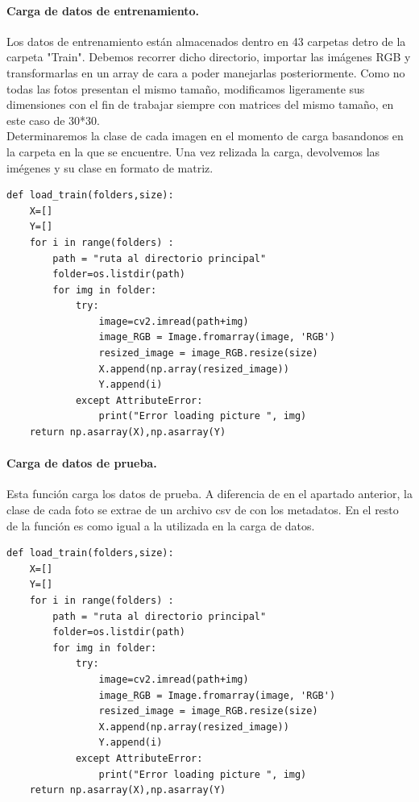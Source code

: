 \documentclass[a4paper,10pt]{article}
\begin{document}
\paragraph{Carga de datos de entrenamiento.}
Los datos de entrenamiento están almacenados dentro en 43 carpetas detro de la carpeta "Train". Debemos recorrer dicho directorio, importar las imágenes RGB y transformarlas en un array de cara a poder manejarlas posteriormente. Como no todas las fotos presentan el mismo tamaño, modificamos ligeramente sus dimensiones con el fin de trabajar siempre con matrices del mismo tamaño, en este caso de 30*30.\\
Determinaremos la clase de cada imagen en el momento de carga basandonos en la carpeta en la que se encuentre. Una vez relizada la carga, devolvemos las imégenes y su clase en formato de matriz.
\begin{lstlisting}
def load_train(folders,size):
    X=[]
    Y=[]
    for i in range(folders) :
        path = "ruta al directorio principal"
        folder=os.listdir(path)
        for img in folder:
            try:
                image=cv2.imread(path+img)
                image_RGB = Image.fromarray(image, 'RGB')
                resized_image = image_RGB.resize(size)
                X.append(np.array(resized_image))
                Y.append(i)
            except AttributeError:
                print("Error loading picture ", img)
    return np.asarray(X),np.asarray(Y)
\end{lstlisting}

\paragraph{Carga de datos de prueba.}
Esta función carga los datos de prueba. A diferencia de en el apartado anterior, la clase de cada foto se extrae de un archivo csv de con los metadatos. En el resto de la función es como igual a la utilizada en la carga de datos.

\begin{lstlisting}
def load_train(folders,size):
    X=[]
    Y=[]
    for i in range(folders) :
        path = "ruta al directorio principal"
        folder=os.listdir(path)
        for img in folder:
            try:
                image=cv2.imread(path+img)
                image_RGB = Image.fromarray(image, 'RGB')
                resized_image = image_RGB.resize(size)
                X.append(np.array(resized_image))
                Y.append(i)
            except AttributeError:
                print("Error loading picture ", img)
    return np.asarray(X),np.asarray(Y)
\end{lstlisting}
\end{document}
